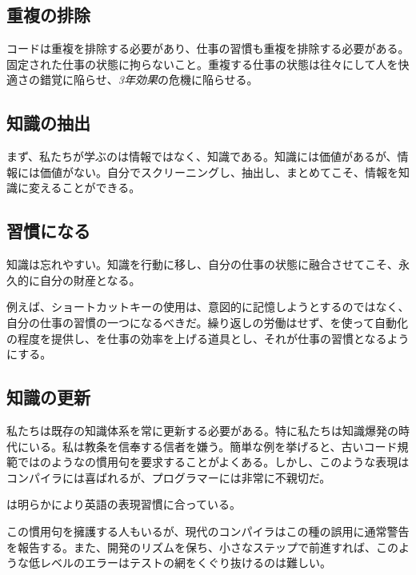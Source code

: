 \begin{content}

\subsection{重複の排除}

コードは重複を排除する必要があり、仕事の習慣も重複を排除する必要がある。固定された仕事の状態に拘らないこと。重複する仕事の状態は往々にして人を快適さの錯覚に陥らせ、\emph{3年効果}の危機に陥らせる。

\subsection{知識の抽出}

まず、私たちが学ぶのは情報ではなく、知識である。知識には価値があるが、情報には価値がない。自分でスクリーニングし、抽出し、まとめてこそ、情報を知識に変えることができる。

\subsection{習慣になる}

知識は忘れやすい。知識を行動に移し、自分の仕事の状態に融合させてこそ、永久的に自分の財産となる。

例えば、ショートカットキーの使用は、意図的に記憶しようとするのではなく、自分の仕事の習慣の一つになるべきだ。繰り返しの労働はせず、を使って自動化の程度を提供し、を仕事の効率を上げる道具とし、それが仕事の習慣となるようにする。

\subsection{知識の更新}

私たちは既存の知識体系を常に更新する必要がある。特に私たちは知識爆発の時代にいる。私は教条を信奉する信者を嫌う。簡単な例を挙げると、古いコード規範ではのようなの慣用句を要求することがよくある。しかし、このような表現はコンパイラには喜ばれるが、プログラマーには非常に不親切だ。

は明らかにより英語の表現習慣に合っている。

この慣用句を擁護する人もいるが、現代のコンパイラはこの種の誤用に通常警告を報告する。また、開発のリズムを保ち、小さなステップで前進すれば、このような低レベルのエラーはテストの網をくぐり抜けるのは難しい。


\end{content}
